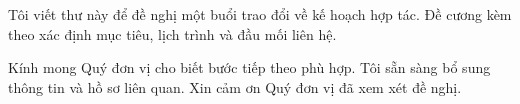Tôi viết thư này để đề nghị một buổi trao đổi về kế hoạch hợp tác. Đề cương kèm theo xác định mục tiêu, lịch trình và đầu mối liên hệ.

Kính mong Quý đơn vị cho biết bước tiếp theo phù hợp. Tôi sẵn sàng bổ sung thông tin và hồ sơ liên quan. Xin cảm ơn Quý đơn vị đã xem xét đề nghị.
